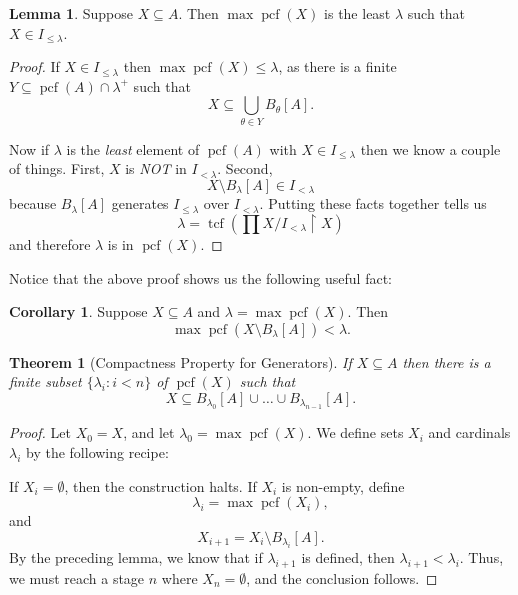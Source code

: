\documentclass[10pt]{amsart}
\theoremstyle{plain}
\newtheorem{theorem}{Theorem}
\theoremstyle{definition}
\newtheorem{corollary}[proposition]{Corollary}
\newtheorem{lemma}[proposition]{Lemma}
\theoremstyle{remark}
\DeclareMathOperator{\tcf}{tcf}
\DeclareMathOperator{\pcf}{pcf}
\numberwithin{equation}{section}
\begin{document}
\begin{lemma}
Suppose $X\subseteq A$.  Then $\max\pcf(X)$ is the least $\lambda$ such that $X\in I_{\leq\lambda}$.
\end{lemma}
\begin{proof}
If $X\in I_{\leq\lambda}$ then $\max\pcf(X)\leq\lambda$, as there is a finite $Y\subseteq\pcf(A)\cap\lambda^+$ such that
\begin{equation}
X\subseteq\bigcup_{\theta\in Y} B_\theta[A].
\end{equation}

Now if $\lambda$ is the {\em least} element of $\pcf(A)$ with $X\in I_{\leq\lambda}$ then we know a couple of things.  First,  $X$ is {\em NOT} in $I_{<\lambda}$.  Second,
\begin{equation}
X\setminus B_{\lambda}[A]\in I_{<\lambda}
\end{equation}
because $B_{\lambda}[A]$ generates $I_{\leq\lambda}$ over $I_{<\lambda}$.  Putting these facts together tells us
\begin{equation}
\lambda = \tcf\left(\prod X/ I_{<\lambda}\restriction X\right)
\end{equation}
and therefore $\lambda$ is in $\pcf(X)$.
\end{proof}

Notice that the above proof shows us the following useful fact:
\begin{corollary}
Suppose $X\subseteq A$ and $\lambda=\max\pcf(X)$.  Then
\begin{equation}
\max\pcf\left(X\setminus B_\lambda[A]\right)<\lambda.
\end{equation}
\end{corollary}

\begin{theorem}[Compactness Property for Generators]\label{thm1}
If $X\subseteq A$ then there is a finite subset $\{\lambda_i:i<n\}$ of $\pcf(X)$ such that
\begin{equation}
X\subseteq B_{\lambda_0}[A]\cup\dots\cup B_{\lambda_{n-1}}[A].
\end{equation}
\end{theorem}
\begin{proof}
Let $X_0 = X$, and let $\lambda_0 = \max\pcf(X)$.  We define sets $X_i$ and cardinals $\lambda_i$ by the following recipe:

If $X_i=\emptyset$, then the construction halts.  If $X_i$ is non-empty, define
\begin{equation}
\lambda_i = \max\pcf(X_i),
\end{equation}
and
\begin{equation}
X_{i+1} = X_i\setminus B_{\lambda_i}[A].
\end{equation}
By the preceding lemma, we know that if $\lambda_{i+1}$ is defined, then $\lambda_{i+1}<\lambda_i$.  Thus, we must reach a stage $n$ where $X_n = \emptyset$, and the conclusion follows.
\end{proof}
\end{document}
